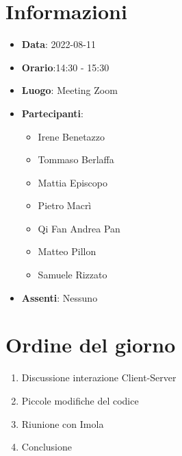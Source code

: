 \section{Informazioni}
	\begin{itemize}
		\item \textbf{Data}: 2022-08-11     %
		\item \textbf{Orario}:14:30 - 15:30         %
		\item \textbf{Luogo}: Meeting Zoom
		\item \textbf{Partecipanti}:
		\begin{itemize}
			\item Irene Benetazzo
			\item Tommaso Berlaffa
			\item Mattia Episcopo
			\item Pietro Macrì
			\item Qi Fan Andrea Pan
			\item Matteo Pillon
			\item Samuele Rizzato
		\end{itemize}
        \item \textbf{Assenti}: Nessuno
	\end{itemize}
    
	\section{Ordine del giorno}
	\begin{enumerate}
		\item Discussione interazione Client-Server
		\item Piccole modifiche del codice
		\item Riunione con Imola
		\item Conclusione
	\end{enumerate}
	\newpage